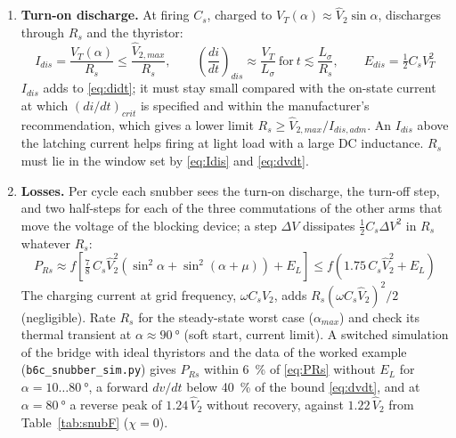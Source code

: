 \documentclass[10pt,a4paper]{scrartcl}
\begin{document}
\begin{enumerate}[label=\textbf{C\arabic*},leftmargin=*]
\begin{equation}
\end{equation}
$g = 2\zeta_s$ for $\zeta_s\ge0.5$ (maximum at $t=0^+$), $g\approx0.8\ldots0.9$ for $\zeta_s = 0.3\ldots0.4$. $\Delta V = \hat V_{2,max}$ is conservative: the notches caused by the commutations of the other arms are about $\tfrac12\hat V_2\sin\alpha$ per step. The step $R_sI_{RM}$ at snap-off is in the reverse direction and is covered by C1; in rectifier operation the forward voltage returns on the outgoing device at grid rate.
\item \textbf{Turn-on discharge.} At firing $C_s$, charged to $V_T(\alpha)\approx\hat V_2\sin\alpha$, discharges through $R_s$ and the thyristor:
\begin{equation}
I_{dis} = \frac{V_T(\alpha)}{R_s} \le \frac{\hat V_{2,max}}{R_s}, \qquad
\left(\frac{di}{dt}\right)_{dis} \approx \frac{V_T}{L_\sigma}\ \text{for}\ t \lesssim \frac{L_\sigma}{R_s}, \qquad
E_{dis} = \tfrac12 C_sV_T^2 \label{eq:Idis}
\end{equation}
$I_{dis}$ adds to \eqref{eq:didt}; it must stay small compared with the on-state current at which $(di/dt)_{crit}$ is specified and within the manufacturer's recommendation, which gives a lower limit $R_s \ge \hat V_{2,max}/I_{dis,adm}$. An $I_{dis}$ above the latching current helps firing at light load with a large DC inductance. $R_s$ must lie in the window set by \eqref{eq:Idis} and \eqref{eq:dvdt}.
\item \textbf{Losses.} Per cycle each snubber sees the turn-on discharge, the turn-off step, and two half-steps for each of the three commutations of the other arms that move the voltage of the blocking device; a step $\Delta V$ dissipates $\tfrac12C_s\Delta V^2$ in $R_s$ whatever $R_s$:
\begin{equation}
P_{Rs} \approx f\left[\tfrac78\,C_s\hat V_2^2\left(\sin^2\alpha + \sin^2(\alpha+\mu)\right) + E_L\right] \le f\left(1.75\,C_s\hat V_2^2 + E_L\right) \label{eq:PRs}
\end{equation}
The charging current at grid frequency, $\omega C_s\hat V_2$, adds $R_s(\omega C_s\hat V_2)^2/2$ (negligible). Rate $R_s$ for the steady-state worst case ($\alpha_{max}$) and check its thermal transient at $\alpha\approx\SI{90}{\degree}$ (soft start, current limit). A switched simulation of the bridge with ideal thyristors and the data of the worked example (\texttt{b6c\_snubber\_sim.py}) gives $P_{Rs}$ within \SI{6}{\percent} of \eqref{eq:PRs} without $E_L$ for $\alpha = 10\ldots\SI{80}{\degree}$, a forward $dv/dt$ below \SI{40}{\percent} of the bound \eqref{eq:dvdt}, and at $\alpha = \SI{80}{\degree}$ a reverse peak of $1.24\,\hat V_2$ without recovery, against $1.22\,\hat V_2$ from Table~\ref{tab:snubF} ($\chi = 0$).

\end{enumerate}
\end{document}
